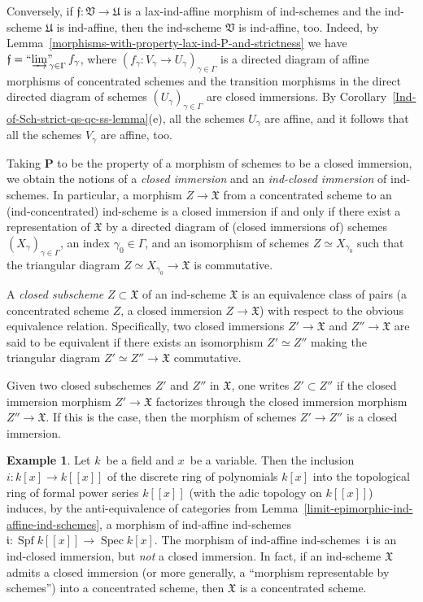 \documentclass[12pt,a4paper]{amsart}
\newcommand{\+}{\protect\nobreakdash-}
\renewcommand{\:}{\colon}
\newcommand{\rarrow}{\longrightarrow}
\DeclareMathOperator{\Spec}{Spec}
\DeclareMathOperator{\Spf}{Spf}
\newcommand{\ilim}
 {\mathop{\text{\normalfont``$\varinjlim$''\!\!}}\nolimits}
\newcommand{\bP}{\mathbf P}
\newcommand{\fX}{\mathfrak X}
\newcommand{\fU}{\mathfrak U}
\newcommand{\fV}{\mathfrak V}
\newcommand{\ff}{\mathfrak f}
\newcommand{\fii}{\mathfrak i}
\theoremstyle{plain}
\theoremstyle{definition}
\newtheorem{ex}[thm]{Example}
\begin{document}
 Conversely, if $\ff:\fV\rarrow\fU$ is a lax-ind-affine morphism of
ind-schemes and the ind-scheme $\fU$ is ind-affine, then
the ind-scheme $\fV$ is ind-affine, too.
 Indeed, by Lemma~\ref{morphisms-with-property-lax-ind-P-and-strictness}
we have $\ff=\ilim_{\gamma\in\Gamma}f_\gamma$, where
$(f_\gamma\:V_\gamma\rarrow U_\gamma)_{\gamma\in\Gamma}$ is a directed
diagram of affine morphisms of concentrated schemes and the transition
morphisms in the direct directed diagram of schemes
$(U_\gamma)_{\gamma\in\Gamma}$ are closed immersions.
 By Corollary~\ref{Ind-of-Sch-strict-qs-qc-ss-lemma}(e), all
the schemes $U_\gamma$ are affine, and it follows that all
the schemes $V_\gamma$ are affine, too.

 Taking $\bP$ to be the property of a morphism of schemes to be
a closed immersion, we obtain the notions of a \emph{closed immersion}
and an \emph{ind-closed immersion} of ind-schemes.
 In particular, a morphism $Z\rarrow\fX$ from a concentrated scheme
to an (ind-concentrated) ind-scheme is a closed immersion if and only
if there exist a representation of $\fX$ by a directed diagram of
(closed immersions of) schemes $(X_\gamma)_{\gamma\in\Gamma}$,
an index $\gamma_0\in\Gamma$, and an isomorphism of schemes
$Z\simeq X_{\gamma_0}$ such that the triangular diagram
$Z\simeq X_{\gamma_0}\rarrow\fX$ is commutative.

 A \emph{closed subscheme} $Z\subset\fX$ of an ind-scheme $\fX$ is
an equivalence class of pairs (a concentrated scheme $Z$, a closed
immersion $Z\rarrow\fX$) with respect to the obvious equivalence
relation.
 Specifically, two closed immersions $Z'\rarrow\fX$ and $Z''\rarrow\fX$
are said to be equivalent if there exists an isomorphism $Z'\simeq Z''$
making the triangular diagram $Z'\simeq Z''\rarrow\fX$ commutative.

 Given two closed subschemes $Z'$ and $Z''$ in $\fX$, one writes
$Z'\subset Z''$ if the closed immersion morphism $Z'\rarrow\fX$
factorizes through the closed immersion morphism $Z''\rarrow\fX$.
 If this is the case, then the morphism of schemes $Z'\rarrow Z''$
is a closed immersion.

\begin{ex} \label{ind-closed-not-closed-immersion-example}
 Let $k$~be a field and $x$~be a variable.
 Then the inclusion $i\:k[x]\rarrow k[[x]]$ of the discrete ring of
polynomials $k[x]$ into the topological ring of formal power series
$k[[x]]$ (with the adic topology on $k[[x]]$) induces, by
the anti-equivalence of categories from
Lemma~\ref{limit-epimorphic-ind-affine-ind-schemes}, a morphism
of ind-affine ind-schemes $\fii:\Spf k[[x]]\rarrow\Spec k[x]$.
 The morphism of ind-affine ind-schemes~$\fii$ is an ind-closed
immersion, but \emph{not} a closed immersion.
 In fact, if an ind-scheme $\fX$ admits a closed immersion (or more
generally, a ``morphism representable by schemes'') into a concentrated
scheme, then $\fX$ is a concentrated scheme.
\end{ex}
\end{document}
